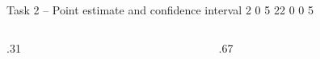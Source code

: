 \documentclass[12pt,aspectratio=169]{beamer}
\newif\ifReference
\begin{document}
\begin{frame}[t]{Task 2 -- Point estimate and confidence interval}
\Referencetrue
\expandafter\def\csname Input5\endcsname{2}
\expandafter\def\csname Input6\endcsname{0}
\expandafter\def\csname Input7\endcsname{5}
\expandafter\def\csname Input9\endcsname{22}
\expandafter\def\csname Input11\endcsname{0}
\expandafter\def\csname Input13\endcsname{0}
\expandafter\def\csname Input15\endcsname{5}
\vspace{-7mm}
\begin{columns}[T,onlytextwidth]
\begin{column}{.31\textwidth}\TaskTwoReference\end{column}
\begin{column}{.67\textwidth}\TaskTwoWorkingTable\end{column}
\end{columns}
\end{frame}
\end{document}
